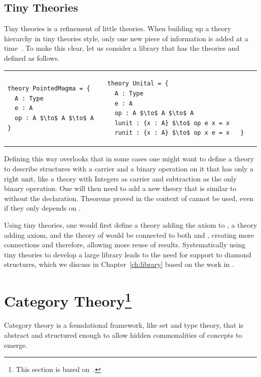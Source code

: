 \subsection{Tiny Theories}
\label{sec:background:tinytheories}
Tiny theories is a refinement of little theories. When building up a theory hierarchy in tiny theories style, only one new piece of information is added at a time~\cite{mathscheme2011experiments}. To make this clear, let us consider a library that has the theories  and  defined as follows. \\
\begin{tabular}{p{6cm} p{7cm}}
\begin{lstlisting}[mathescape, basicstyle=\footnotesize]
theory PointedMagma = { 
  A : Type 
  e : A 
  op : A $\to$ A $\to$ A }
\end{lstlisting}
&
\begin{lstlisting}[mathescape, basicstyle=\footnotesize]
theory Unital = {
  A : Type 
  e : A 
  op : A $\to$ A $\to$ A 
  lunit : {x : A} $\to$ op e x = x
  runit : {x : A} $\to$ op x e = x   }   
\end{lstlisting}
\end{tabular}

Defining  this way overlooks that in some cases one might want to define a theory to describe structures with a carrier and a binary operation on it that has only a right unit, like a theory with Integers as carrier and subtraction as the only binary operation. 
One will then need to add a new theory that is similar to  without the  declaration. Theorems proved in the context of  cannot be used, even if they only depends on . 

Using tiny theories, one would first define a  theory adding the  axiom to , a  theory adding  axiom, and the theory of  would be connected to both  and , creating more connections and therefore, allowing more reuse of results. Systematically using tiny theories to develop a large library leads to the need for support to diamond structures, which we discuss in Chapter~\ref{ch:library} based on the work in \cite{carette2018building}.  

\section[Category Theory]{Category Theory\footnote{This section is based on~\cite{pierce1990taste}.}}
\label{sec:categoryTh}
Category theory is a foundational framework, like set and type theory, that is abstract and structured enough to allow hidden commonalities of concepts to emerge. 

